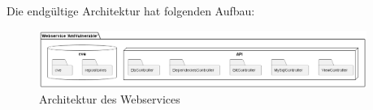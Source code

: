     Die endgültige Architektur hat folgenden Aufbau:
    \begin{figure}[H]
        \centering
        \includegraphics[width=0.95\textwidth]{5_concept/architecture.png}
        \caption{Architektur des Webservices}
        \label{png:ArchitekturDesWebservices}
    \end{figure}
